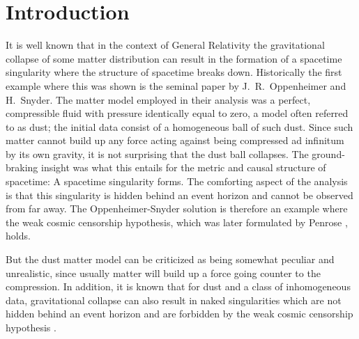 \documentclass[11pt]{article}
\begin{document}
\section{Introduction}
\setcounter{equation}{0}
%
%
It is well known that in the context of General Relativity the gravitational
collapse of some matter distribution can result in the formation of a spacetime
singularity where the structure of spacetime breaks down. Historically the first
example where this was shown is the seminal paper \cite{OS} by
{\sc J.~R.~Oppenheimer} and {\sc H.~Snyder}.
The matter model employed in their analysis was a perfect, compressible
fluid with pressure identically equal to zero, a model often referred to
as dust; the initial data consist of a homogeneous
ball of such dust. Since such matter cannot
build up any force acting against being compressed
ad infinitum by its own gravity, 
it is not surprising that the dust ball collapses.
The ground-braking insight was what this entails for the metric
and causal structure of spacetime: A spacetime singularity
forms. The comforting aspect of the analysis is that this
singularity is hidden behind
an event horizon and cannot be observed from far away.
The Oppenheimer-Snyder solution
is therefore an example where the weak cosmic censorship hypothesis, which
was later formulated by {\sc Penrose} \cite{pen}, holds.

But the dust matter model can be criticized as being somewhat peculiar
and unrealistic, since usually matter will build up a force going counter
to the compression. In addition, it is known that for dust and a class of
inhomogeneous data,
gravitational collapse can also result in naked singularities
which are not hidden behind an event horizon and are forbidden by the
weak cosmic censorship hypothesis \cite{chrnd}.
\end{document}
